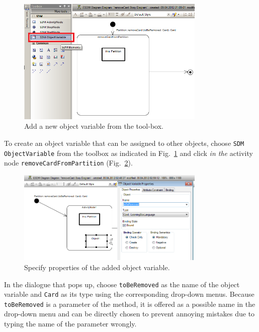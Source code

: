 \begin{figure}[htp]
\begin{center}
  \includegraphics[width=0.8\textwidth]{pics/sdmBilder/removeCard/sdm09RAW}
  \caption{Add a new object variable from the tool-box.}  
  \label{fig:tool_box}
\end{center}
\end{figure}

To create an object variable that can be assigned to other objects, choose \texttt{SDM ObjectVariable} from the toolbox as indicated in
Fig.~\ref{fig:tool_box} and click \emph{in the} activity node \texttt{removeCardFromPartition} (Fig.~\ref{fig:object_variable_properties}). 


\begin{figure}[htp]
\begin{center}
  \includegraphics[width=0.8\textwidth]{pics/sdmBilder/removeCard/sdm10RAW}
  \caption{Specify properties of the added object variable.}  
  \label{fig:object_variable_properties}
\end{center}
\end{figure}

In the dialogue that pops up, choose \texttt{toBeRemoved} as the name of the object variable and \texttt{Card} as its type using the corresponding drop-down menus. 
Because \texttt{toBeRemoved} is a parameter of the method, it is offered as a possible name in the drop-down menu and can be directly chosen to prevent annoying mistakes due to typing the name of the parameter wrongly.

